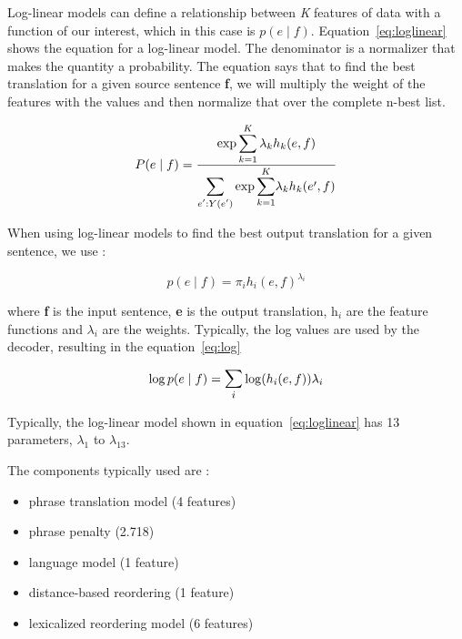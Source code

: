 Log-linear models can define a relationship between \emph{K} features of data with a function of our interest, which in this case is $p(e \mid f)$. Equation~\eqref{eq:loglinear} shows the equation for a log-linear model. The denominator is a normalizer that makes the quantity a probability. The equation says that to find the best translation  for a given source sentence \textbf{f}, we will multiply the weight of the features with the values and then normalize that over the complete n-best list. 

\begin{equation} \label{eq:loglinear}
P(e \mid f) = \frac{\exp\mathlarger{\sum\limits_{k=1}^{K} \lambda_{k}h_{k}(e, f)}}{\mathlarger\sum\limits_{e':Y(e')}\exp\mathlarger\sum_{k=1}^{K}\lambda_{k}h_{k}(e',f)} 
\end{equation}


When using log-linear models to find the best output translation for a given sentence, we use : 

\begin{equation}
	p(e \mid f) = 	\pi_{i}h_{i}(e, f)^{\lambda_{i}}
\end{equation}

where \textbf{f} is the input sentence, \textbf{e} is the output translation, h$_{i}$ are the feature functions and $\lambda_{i}$ are the weights. Typically, the log values are used by the decoder, resulting in the equation~\eqref{eq:log}

\begin{equation} \label{eq:log}
	\log p(e \mid f) = \mathlarger{\sum_{i}} \log(h_{i}(e, f)) \lambda_{i}
\end{equation}

Typically, the log-linear model shown in equation~\eqref{eq:loglinear} has 13 parameters, $\lambda_{1}$ to $\lambda_{13}$.

The components typically used are : 
	\begin{itemize}
		\item phrase translation model (4 features)
		\item phrase penalty (2.718)
		\item language model (1 feature)
		\item distance-based reordering (1 feature)
		\item lexicalized reordering model (6 features)
	\end{itemize}


